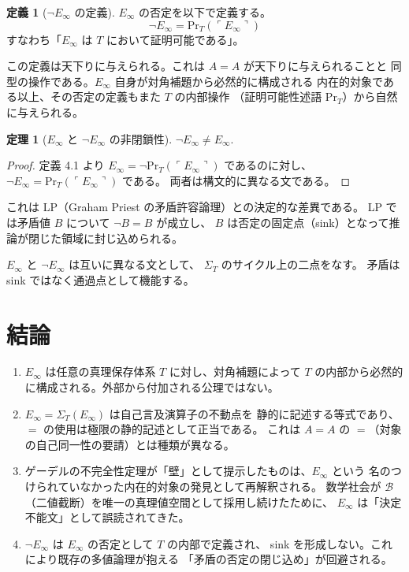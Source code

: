 \documentclass[11pt,a4paper]{article}
\theoremstyle{definition}
\newtheorem{definition}{定義}[section]
\newtheorem{theorem}{定理}[section]
\newcommand{\Bval}{\mathcal{B}}
\newcommand{\Einfty}{E_\infty}
\newcommand{\SelfRef}{\Sigma}
\renewcommand{\Pr}{\mathrm{Pr}}
\begin{document}
\begin{definition}[$\neg \Einfty$ の定義]
$\Einfty$ の否定を以下で定義する。
$$\neg \Einfty = \Pr_T(\ulcorner \Einfty \urcorner)$$
すなわち「$\Einfty$ は $T$ において証明可能である」。

この定義は天下りに与えられる。これは $A = A$ が天下りに与えられることと
同型の操作である。$\Einfty$ 自身が対角補題から必然的に構成される
内在的対象である以上、その否定の定義もまた $T$ の内部操作
（証明可能性述語 $\Pr_T$）から自然に与えられる。
\end{definition}

\begin{theorem}[$\Einfty$ と $\neg \Einfty$ の非閉鎖性]
$\neg \Einfty \neq \Einfty$.
\end{theorem}

\begin{proof}
定義 4.1 より $\Einfty = \neg \Pr_T(\ulcorner \Einfty \urcorner)$ であるのに対し、
$\neg \Einfty = \Pr_T(\ulcorner \Einfty \urcorner)$ である。
両者は構文的に異なる文である。
\end{proof}

これは LP（Graham Priest の矛盾許容論理）との決定的な差異である。
LP では矛盾値 $B$ について $\neg B = B$ が成立し、
$B$ は否定の固定点（sink）となって推論が閉じた領域に封じ込められる。

$\Einfty$ と $\neg \Einfty$ は互いに異なる文として、
$\SelfRef_T$ のサイクル上の二点をなす。
矛盾は sink ではなく通過点として機能する。

\section{結論}

\begin{enumerate}[label=(\arabic*)]
    \item $\Einfty$ は任意の真理保存体系 $T$ に対し、対角補題によって
          $T$ の内部から必然的に構成される。外部から付加される公理ではない。
    \item $\Einfty = \SelfRef_T(\Einfty)$ は自己言及演算子の不動点を
          静的に記述する等式であり、$=$ の使用は極限の静的記述として正当である。
          これは $A = A$ の $=$（対象の自己同一性の要請）とは種類が異なる。
    \item ゲーデルの不完全性定理が「壁」として提示したものは、$\Einfty$ という
          名のつけられていなかった内在的対象の発見として再解釈される。
          数学社会が $\Bval$（二値截断）を唯一の真理値空間として採用し続けたために、
          $\Einfty$ は「決定不能文」として誤読されてきた。
    \item $\neg \Einfty$ は $\Einfty$ の否定として $T$ の内部で定義され、
          sink を形成しない。これにより既存の多値論理が抱える
          「矛盾の否定の閉じ込め」が回避される。
\end{enumerate}
\end{document}
